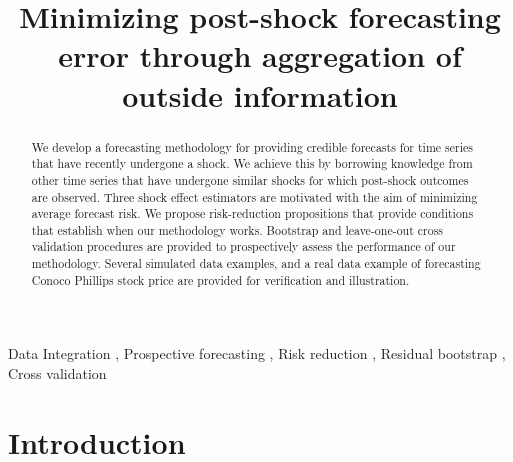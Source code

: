 \documentclass[11pt,3p,review,authoryear]{elsarticle}
\theoremstyle{definition}
\begin{document}
\begin{frontmatter}

\title{Minimizing post-shock forecasting error through aggregation of outside information}




\begin{abstract}
    We develop a forecasting methodology for providing credible forecasts for time series that have recently undergone a shock. We achieve this by borrowing knowledge from other time series that have undergone similar shocks for which post-shock outcomes are observed. Three shock effect estimators are motivated with the aim of minimizing average forecast risk. We propose risk-reduction propositions that provide conditions that establish when our methodology works. Bootstrap and leave-one-out cross validation procedures are provided to prospectively assess the performance of our methodology. Several simulated data examples, and a real data example of forecasting Conoco Phillips stock price are provided for verification and illustration.
\end{abstract}


\begin{keyword}
  Data Integration \sep 
 Prospective forecasting \sep 
 Risk reduction \sep 
Residual bootstrap \sep 
Cross validation 
\end{keyword}

\end{frontmatter}

\section{Introduction}
\end{document}
